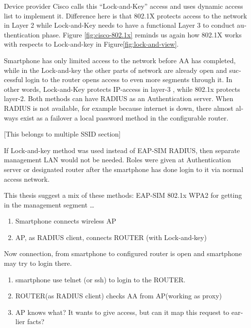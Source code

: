 \documentclass[12pt,a4paper,english]{tutthesis}
\begin{document}
\begin{otherlanguage}{english}
Device provider Cisco calls this
 ``Lock-and-Key''\cite[p.117]{lockandkeybook}
access and uses dynamic access list to implement it.
Difference here is that 802.1X protects access to the network in Layer
2 while Lock-and-Key needs to have a functional Layer 3 to conduct
authentication phase.
Figure \ref{fig:cisco-802.1x} reminds us again how 802.1X works with respects to
Lock-and-key in Figure\ref{fig:lock-and-view}.

 Smartphone has only limited access to the network before AA
has completed, while in the Lock-and-key
the other parts of network are already open and successful login to the router opens
access to even more segments through it. In other words, Lock-and-Key
protects IP-access in layer-3 , while 802.1x protects layer-2.
Both methods can have RADIUS as an Authentication server. 
When RADIUS is not available, for example because internet is down,
there almost always exist as a failover a local password method in the configurable 
router.




[This belongs to multiple SSID section]

If Lock-and-key method was used instead of EAP-SIM RADIUS, then
separate management LAN would not be needed. Roles were given at
Authentication server or designated router after the smartphone has done login to it
via normal access network.



This thesis suggest a mix of these methods: EAP-SIM 802.1x WPA2 for
getting in the management segment \ldots{}



\begin{enumerate}
\item Smartphone connects wireless AP
\item AP, as RADIUS client, connects ROUTER (with Lock-and-key)
\end{enumerate}

Now connection,  from smartphone to configured router is open and 
smartphone may try to login there.

\begin{enumerate}
\item smartphone use telnet (or ssh) to login to the ROUTER.
\item ROUTER(as RADIUS client) checks AA from AP(working as
proxy)
\item AP knows what? It wants to give access, but can it map this request to
earlier facts?
\end{enumerate}

\end{otherlanguage}
\end{document}
